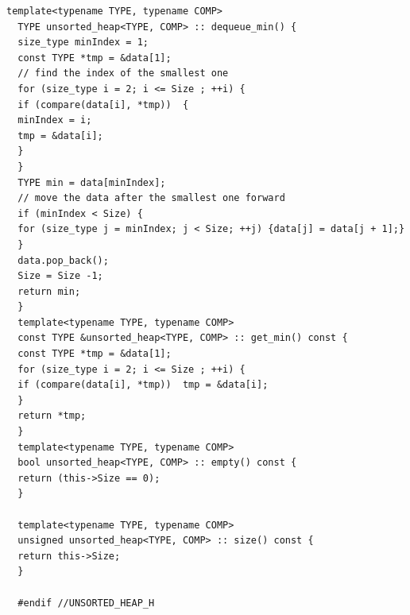 \documentclass[12pt,a4paper]{article}
\theoremstyle{definition}
\begin{document}
\begin{lstlisting}[caption={unsorted\_heap.h}]
  template<typename TYPE, typename COMP>
  TYPE unsorted_heap<TYPE, COMP> :: dequeue_min() {
  size_type minIndex = 1;
  const TYPE *tmp = &data[1];
  // find the index of the smallest one
  for (size_type i = 2; i <= Size ; ++i) {
  if (compare(data[i], *tmp))  {
  minIndex = i;
  tmp = &data[i];
  }
  }
  TYPE min = data[minIndex];
  // move the data after the smallest one forward
  if (minIndex < Size) {
  for (size_type j = minIndex; j < Size; ++j) {data[j] = data[j + 1];}
  }
  data.pop_back();
  Size = Size -1;
  return min;
  }
  template<typename TYPE, typename COMP>
  const TYPE &unsorted_heap<TYPE, COMP> :: get_min() const {
  const TYPE *tmp = &data[1];
  for (size_type i = 2; i <= Size ; ++i) {
  if (compare(data[i], *tmp))  tmp = &data[i];
  }
  return *tmp;
  }
  template<typename TYPE, typename COMP>
  bool unsorted_heap<TYPE, COMP> :: empty() const {
  return (this->Size == 0);
  }
  
  template<typename TYPE, typename COMP>
  unsigned unsorted_heap<TYPE, COMP> :: size() const { 
  return this->Size;
  }
  
  #endif //UNSORTED_HEAP_H
  \end{lstlisting}
 
\end{document}
